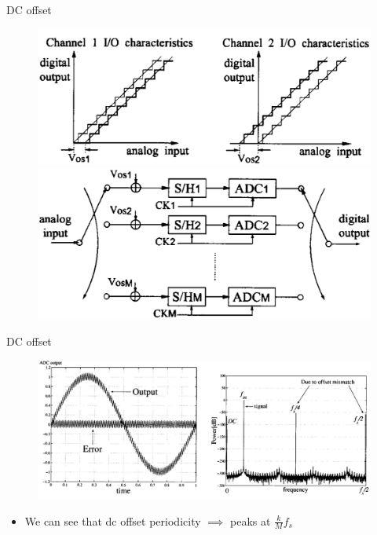 \documentclass{beamer}
\begin{document}
\begin{frame}{DC offset}
\begin{figure}
	\includegraphics[scale=0.2]{./figs/Dc.png}
	\includegraphics[scale=0.2]{./figs/Dccir.png}
\end{figure}
\end{frame}

\begin{frame}{DC offset}
\begin{figure}
	\includegraphics[scale=0.3]{./figs/Dcplot .png}
\end{figure}
\pause
\begin{itemize}
\item We can see that dc offset periodicity $\implies$ peaks at $\frac{k}{M}f_{s}$
\end{itemize}
\end{frame}
\end{document}
